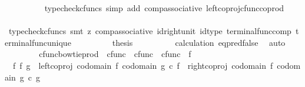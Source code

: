 \begin{isabellebody}
\ \ \ \ \ \ \ \ \isamarkupfalse%
\ {\isacharparenleft}{\kern0pt}typecheck{\isacharunderscore}{\kern0pt}cfuncs{\isacharcomma}{\kern0pt}\ simp\ add{\isacharcolon}{\kern0pt}\ comp{\isacharunderscore}{\kern0pt}associative{}\ left{\isacharunderscore}{\kern0pt}coproj{\isacharunderscore}{\kern0pt}cfunc{\isacharunderscore}{\kern0pt}coprod{\isacharparenright}{\kern0pt}\isanewline
\ \ \ \ \ \ \isamarkupfalse%
\ \isamarkupfalse%
\ {\isachardoublequoteopen}{\isachardot}{\kern0pt}{\isachardot}{\kern0pt}{\isachardot}{\kern0pt}\ {\isacharequal}{\kern0pt}\ {\isasymf}{\isachardoublequoteclose}\isanewline
\ \ \ \ \ \ \ \ \isamarkupfalse%
\ {\isacharparenleft}{\kern0pt}typecheck{\isacharunderscore}{\kern0pt}cfuncs{\isacharcomma}{\kern0pt}\ smt\ {\isacharparenleft}{\kern0pt}z{}{\isacharparenright}{\kern0pt}\ comp{\isacharunderscore}{\kern0pt}associative{}\ id{\isacharunderscore}{\kern0pt}right{\isacharunderscore}{\kern0pt}unit{}\ id{\isacharunderscore}{\kern0pt}type\ terminal{\isacharunderscore}{\kern0pt}func{\isacharunderscore}{\kern0pt}comp\ terminal{\isacharunderscore}{\kern0pt}func{\isacharunderscore}{\kern0pt}unique{\isacharparenright}{\kern0pt}\isanewline
\ \ \ \ \ \ \isamarkupfalse%
\ \isamarkupfalse%
\ {\isacharquery}{\kern0pt}thesis\isanewline
\ \ \ \ \ \ \ \ \isamarkupfalse%
\ calculation\ eq{\isacharunderscore}{\kern0pt}pred{\isacharunderscore}{\kern0pt}false\ \isamarkupfalse%
\ auto\isanewline
\ \ \ \ \isamarkupfalse%
\isanewline
\ \ \isamarkupfalse%
\isanewline
{}\isamarkupfalse%
%
\endisatagproof
{\isafoldproof}%
%
\isadelimproof
%
\endisadelimproof
%
\isadelimdocument
%
\endisadelimdocument
%
\isatagdocument
%
\isamarkuptrue%
%
\endisatagdocument
{\isafolddocument}%
%
\isadelimdocument
%
\endisadelimdocument
{}\isamarkupfalse%
\ cfunc{\isacharunderscore}{\kern0pt}bowtie{\isacharunderscore}{\kern0pt}prod\ {\isacharcolon}{\kern0pt}{\isacharcolon}{\kern0pt}\ {\isachardoublequoteopen}cfunc\ {\isasymRightarrow}\ cfunc\ {\isasymRightarrow}\ cfunc{\isachardoublequoteclose}\ {\isacharparenleft}{\kern0pt}\ {\isachardoublequoteopen}{\isasymbowtie}\isactrlsub f{\isachardoublequoteclose}\ {}{}{\isacharparenright}{\kern0pt}\ \isanewline
\ \ {\isachardoublequoteopen}f\ {\isasymbowtie}\isactrlsub f\ g\ {\isacharequal}{\kern0pt}\ {\isacharparenleft}{\kern0pt}{\isacharparenleft}{\kern0pt}left{\isacharunderscore}{\kern0pt}coproj\ {\isacharparenleft}{\kern0pt}codomain\ f{\isacharparenright}{\kern0pt}\ {\isacharparenleft}{\kern0pt}codomain\ g{\isacharparenright}{\kern0pt}{\isacharparenright}{\kern0pt}\ {\isasymcirc}\isactrlsub c\ f{\isacharparenright}{\kern0pt}\ {\isasymamalg}\ {\isacharparenleft}{\kern0pt}{\isacharparenleft}{\kern0pt}right{\isacharunderscore}{\kern0pt}coproj\ {\isacharparenleft}{\kern0pt}codomain\ f{\isacharparenright}{\kern0pt}\ {\isacharparenleft}{\kern0pt}codomain\ g{\isacharparenright}{\kern0pt}{\isacharparenright}{\kern0pt}\ {\isasymcirc}\isactrlsub c\ g{\isacharparenright}{\kern0pt}{\isachardoublequoteclose}\isanewline

\end{isabellebody}
